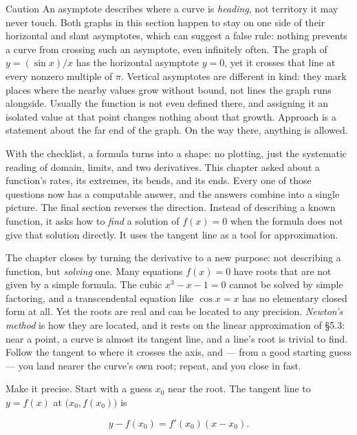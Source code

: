 \documentclass[a4paper,12pt,oneside]{memoir}
\begin{document}
\begin{envcaution}{Caution}{}{}
An asymptote describes where a curve is \emph{heading}, not territory it may never touch. Both graphs in this section happen to stay on one side of their horizontal and slant asymptotes, which can suggest a false rule: nothing prevents a curve from crossing such an asymptote, even infinitely often. The graph of \(y = (\sin x)/x\) has the horizontal asymptote \(y = 0\), yet it crosses that line at every nonzero multiple of \(\pi\). Vertical asymptotes are different in kind: they mark places where the nearby values grow without bound, not lines the graph runs alongside. Usually the function is not even defined there, and assigning it an isolated value at that point changes nothing about that growth. Approach is a statement about the far end of the graph. On the way there, anything is allowed.
\end{envcaution}
With the checklist, a formula turns into a shape: no plotting, just the systematic reading of domain, limits, and two derivatives. This chapter asked about a function’s rates, its extremes, its bends, and its ends. Every one of those questions now has a computable answer, and the answers combine into a single picture. The final section reverses the direction. Instead of describing a known function, it asks how to \emph{find} a solution of \(f(x) = 0\) when the formula does not give that solution directly. It uses the tangent line as a tool for approximation.


The chapter closes by turning the derivative to a new purpose: not describing a function, but \emph{solving} one. Many equations \(f(x) = 0\) have roots that are not given by a simple formula. The cubic \(x^{3} - x - 1 = 0\) cannot be solved by simple factoring, and a transcendental equation like \(\cos x = x\) has no elementary closed form at all. Yet the roots are real and can be located to any precision. \emph{Newton’s method} is how they are located, and it rests on the linear approximation of §5.3: near a point, a curve is almost its tangent line, and a line’s root is trivial to find. Follow the tangent to where it crosses the axis, and — from a good starting guess — you land nearer the curve’s own root; repeat, and you close in fast.

Make it precise. Start with a guess \(x_{0}\) near the root. The tangent line to \(y = f(x)\) at \(\bigl(x_{0}, f(x_{0})\bigr)\) is

\[ y - f(x_{0}) = f'(x_{0})(x - x_{0}). \]
\end{document}
